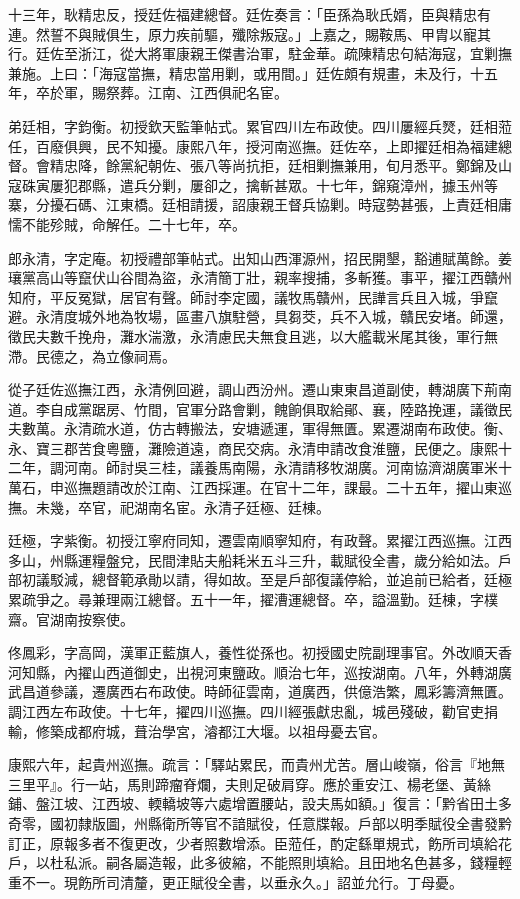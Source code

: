 \begin{pinyinscope}
十三年，耿精忠反，授廷佐福建總督。廷佐奏言：「臣孫為耿氏婿，臣與精忠有連。然誓不與賊俱生，原力疾前驅，殲除叛寇。」上嘉之，賜鞍馬、甲胄以寵其行。廷佐至浙江，從大將軍康親王傑書治軍，駐金華。疏陳精忠句結海寇，宜剿撫兼施。上曰：「海寇當撫，精忠當用剿，或用間。」廷佐頗有規畫，未及行，十五年，卒於軍，賜祭葬。江南、江西俱祀名宦。

弟廷相，字鈞衡。初授欽天監筆帖式。累官四川左布政使。四川屢經兵燹，廷相蒞任，百廢俱興，民不知擾。康熙八年，授河南巡撫。廷佐卒，上即擢廷相為福建總督。會精忠降，餘黨紀朝佐、張八等尚抗拒，廷相剿撫兼用，旬月悉平。鄭錦及山寇硃寅屢犯郡縣，遣兵分剿，屢卻之，擒斬甚眾。十七年，錦窺漳州，據玉州等寨，分擾石碼、江東橋。廷相請援，詔康親王督兵協剿。時寇勢甚張，上責廷相庸懦不能殄賊，命解任。二十七年，卒。

郎永清，字定庵。初授禮部筆帖式。出知山西渾源州，招民開墾，豁逋賦萬餘。姜瓖黨高山等竄伏山谷間為盜，永清簡丁壯，親率搜捕，多斬獲。事平，擢江西贛州知府，平反冤獄，居官有聲。師討李定國，議牧馬贛州，民譁言兵且入城，爭竄避。永清度城外地為牧場，區畫八旗駐營，具芻茭，兵不入城，贛民安堵。師還，徵民夫數千挽舟，灘水湍激，永清慮民夫無食且逃，以大艦載米尾其後，軍行無滯。民德之，為立像祠焉。

從子廷佐巡撫江西，永清例回避，調山西汾州。遷山東東昌道副使，轉湖廣下荊南道。李自成黨踞房、竹間，官軍分路會剿，餽餉俱取給鄖、襄，陸路挽運，議徵民夫數萬。永清疏水道，仿古轉搬法，安塘遞運，軍得無匱。累遷湖南布政使。衡、永、寶三郡苦食粵鹽，灘險道遠，商民交病。永清申請改食淮鹽，民便之。康熙十二年，調河南。師討吳三桂，議養馬南陽，永清請移牧湖廣。河南協濟湖廣軍米十萬石，申巡撫題請改於江南、江西採運。在官十二年，課最。二十五年，擢山東巡撫。未幾，卒官，祀湖南名宦。永清子廷極、廷棟。

廷極，字紫衡。初授江寧府同知，遷雲南順寧知府，有政聲。累擢江西巡撫。江西多山，州縣運糧盤兌，民間津貼夫船耗米五斗三升，載賦役全書，歲分給如法。戶部初議駁減，總督範承勛以請，得如故。至是戶部復議停給，並追前已給者，廷極累疏爭之。尋兼理兩江總督。五十一年，擢漕運總督。卒，謚溫勤。廷棟，字樸齋。官湖南按察使。

佟鳳彩，字高岡，漢軍正藍旗人，養性從孫也。初授國史院副理事官。外改順天香河知縣，內擢山西道御史，出視河東鹽政。順治七年，巡按湖南。八年，外轉湖廣武昌道參議，遷廣西右布政使。時師征雲南，道廣西，供億浩繁，鳳彩籌濟無匱。調江西左布政使。十七年，擢四川巡撫。四川經張獻忠亂，城邑殘破，勸官吏捐輸，修築成都府城，葺治學宮，濬都江大堰。以祖母憂去官。

康熙六年，起貴州巡撫。疏言：「驛站累民，而貴州尤苦。層山峻嶺，俗言『地無三里平』。行一站，馬則蹄瘤脊爛，夫則足破肩穿。應於重安江、楊老堡、黃絲鋪、盤江坡、江西坡、輭轎坡等六處增置腰站，設夫馬如額。」復言：「黔省田土多奇零，國初隸版圖，州縣衛所等官不諳賦役，任意牒報。戶部以明季賦役全書發黔訂正，原報多者不復更改，少者照數增添。臣蒞任，酌定繇單規式，飭所司填給花戶，以杜私派。嗣各屬造報，此多彼縮，不能照則填給。且田地名色甚多，錢糧輕重不一。現飭所司清釐，更正賦役全書，以垂永久。」詔並允行。丁母憂。


\end{pinyinscope}
